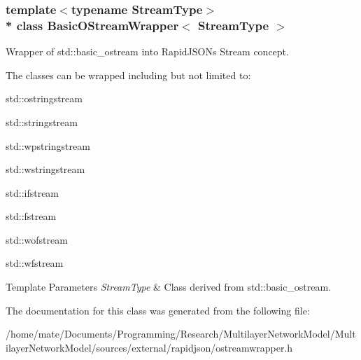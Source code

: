 \subsubsection*{template$<$typename Stream\+Type$>$\\*
class Basic\+O\+Stream\+Wrapper$<$ Stream\+Type $>$}

Wrapper of {\ttfamily std\+::basic\+\_\+ostream} into Rapid\+J\+S\+ON\textquotesingle{}s Stream concept. 

The classes can be wrapped including but not limited to\+:


\begin{DoxyItemize}
\item {\ttfamily std\+::ostringstream} 
\item {\ttfamily std\+::stringstream} 
\item {\ttfamily std\+::wpstringstream} 
\item {\ttfamily std\+::wstringstream} 
\item {\ttfamily std\+::ifstream} 
\item {\ttfamily std\+::fstream} 
\item {\ttfamily std\+::wofstream} 
\item {\ttfamily std\+::wfstream} 
\end{DoxyItemize}


\begin{DoxyTemplParams}{Template Parameters}
{\em Stream\+Type} & Class derived from {\ttfamily std\+::basic\+\_\+ostream}. \\
\hline
\end{DoxyTemplParams}


The documentation for this class was generated from the following file\+:\begin{DoxyCompactItemize}
\item 
/home/mate/\+Documents/\+Programming/\+Research/\+Multilayer\+Network\+Model/\+Multilayer\+Network\+Model/sources/external/rapidjson/ostreamwrapper.\+h\end{DoxyCompactItemize}

